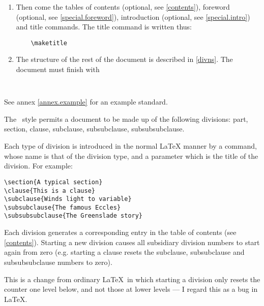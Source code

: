 \begin{enumerate}
\begin{verbatim}
    \end{verbatim}

\item \label{structure.general.maketitle}
    Then come the tables of contents (optional, see \ref{contents}),
    foreword (optional, see \ref{special.foreword}), introduction
    (optional, see \ref{special.intro}) and title commands.
    The title command is written thus:
    \begin{verbatim}
    \maketitle
    \end{verbatim}

\item The structure of the rest of the document is described in \ref{divns}.
    The document must finish with
    \begin{verbatim}
    
    \end{verbatim}
    \end{enumerate}

See annex \ref{annex.example} for an example standard.

\label{divns}

The \iso\ style permits a document to be made up of the following divisions:
part, section, clause, subclause, subsubclause, subsubsubclause.

Each type of division is introduced in the normal LaTeX manner by a command,
whose name is that of the division type, and a parameter which is the title of
the division. For example:
\begin{verbatim}
\section{A typical section}
\clause{This is a clause}
\subclause{Winds light to variable}
\subsubclause{The famous Eccles}
\subsubsubclause{The Greenslade story}
\end{verbatim}

Each division generates a corresponding entry in the table of contents
(see \ref{contents}).
Starting a new division causes all subsidiary division
numbers to start again from zero (e.g. starting a clause resets the
subclause, subsubclause and subsubsubclause numbers to zero).
\begin{note}
This is a change from ordinary \LaTeX\ in which starting a division only
resets the counter one level below, and not those at lower levels --- I
regard this as a bug in \LaTeX.
\end{note}

